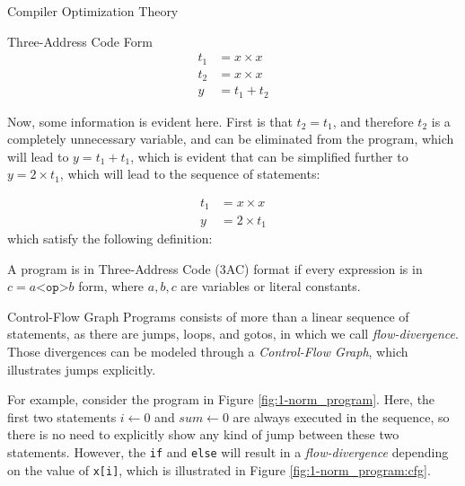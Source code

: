 \begin{section}{Compiler Optimization Theory}
\begin{subsection}{Three-Address Code Form}
\begin{align}
t_1 &= x \times x \nonumber \\
t_2 &= x \times x \nonumber \\
y &= t_1 + t_2 \nonumber
\end{align}

Now, some information is evident here. First is that $t_2 = t_1$,
and therefore $t_2$ is a completely unnecessary variable, and can be
eliminated from the program, which will lead to $y = t_1 + t_1$, which is
evident that can be simplified further to $y = 2 \times t_1$, which will lead
to the sequence of statements:

\begin{align}
t_1 &= x \times x \nonumber \\
y &= 2 \times t_1 \nonumber
\end{align}
which satisfy the following definition:
\begin{definition}
	A program is in Three-Address Code (3AC) format if every expression is
	in $c = a \texttt{<op>} b$ form, where $a, b, c$ are variables or
	literal constants.
\end{definition}

\end{subsection}

\begin{subsection}{Control-Flow Graph}
	Programs consists of more than a linear sequence of statements, as there
	are jumps, loops, and gotos, in which we call
	\textit{flow-divergence}. Those divergences can be modeled through a
	\textit{Control-Flow Graph}, which illustrates jumps explicitly.

	For example,
	consider the program in Figure \ref{fig:1-norm_program}.  Here, the first
	two statements $i \leftarrow 0$ and $\textit{sum} \leftarrow 0$ are always
	executed in the sequence, so there is no need to explicitly show any kind of jump
	between these two statements. However, the \texttt{if} and \texttt{else}
	will result in a \textit{flow-divergence} depending on the value of
	\texttt{x[i]}, which is illustrated in Figure \ref{fig:1-norm_program:cfg}. 


\end{subsection}
\end{section}
